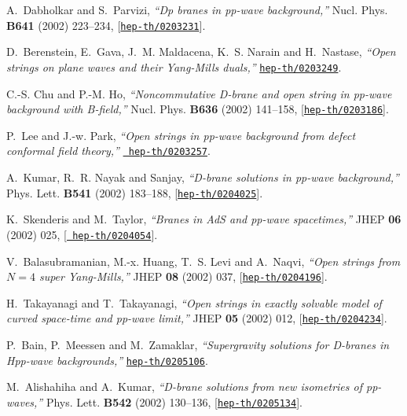 \documentclass[a4paper,12pt]{article}
\numberwithin{equation}{section}
\begin{document}
\begin{thebibliography}{10}
A.~Dabholkar and S.~Parvizi, {\it ``{D}p branes in pp-wave background,''}
  Nucl. Phys. {\bf B641} (2002) 223--234,
  [\href{http://arXiv.org/abs/hep-th/0203231}{{\tt hep-th/0203231}}].

D.~Berenstein, E.~Gava, J.~M. Maldacena, K.~S. Narain and H.~Nastase, {\it
  ``Open strings on plane waves and their {Y}ang-{M}ills duals,''}
  \href{http://arXiv.org/abs/hep-th/0203249}{{\tt hep-th/0203249}}.

C.-S. Chu and P.-M. Ho, {\it ``Noncommutative {D}-brane and open string in
  pp-wave background with {B}-field,''}  Nucl. Phys. {\bf B636} (2002)
  141--158, [\href{http://arXiv.org/abs/hep-th/0203186}{{\tt hep-th/0203186}}].

P.~Lee and J.-w. Park, {\it ``Open strings in pp-wave background from defect
  conformal field theory,''}  \href{http://arXiv.org/abs/hep-th/0203257}{{\tt
  hep-th/0203257}}.

A.~Kumar, R.~R. Nayak and Sanjay, {\it ``{D}-brane solutions in pp-wave
  background,''}  Phys. Lett. {\bf B541} (2002) 183--188,
  [\href{http://arXiv.org/abs/hep-th/0204025}{{\tt hep-th/0204025}}].

K.~Skenderis and M.~Taylor, {\it ``Branes in {AdS} and pp-wave spacetimes,''}
  JHEP {\bf 06} (2002) 025, [\href{http://arXiv.org/abs/hep-th/0204054}{{\tt
  hep-th/0204054}}].

V.~Balasubramanian, M.-x. Huang, T.~S. Levi and A.~Naqvi, {\it ``Open strings
  from {$N = 4$} super {Y}ang-{M}ills,''}  JHEP {\bf 08} (2002) 037,
  [\href{http://arXiv.org/abs/hep-th/0204196}{{\tt hep-th/0204196}}].

H.~Takayanagi and T.~Takayanagi, {\it ``Open strings in exactly solvable model
  of curved space-time and pp-wave limit,''}  JHEP {\bf 05} (2002) 012,
  [\href{http://arXiv.org/abs/hep-th/0204234}{{\tt hep-th/0204234}}].

P.~Bain, P.~Meessen and M.~Zamaklar, {\it ``Supergravity solutions for
  {D}-branes in {H}pp-wave backgrounds,''}
  \href{http://arXiv.org/abs/hep-th/0205106}{{\tt hep-th/0205106}}.

M.~Alishahiha and A.~Kumar, {\it ``{D}-brane solutions from new isometries of
  pp-waves,''}  Phys. Lett. {\bf B542} (2002) 130--136,
  [\href{http://arXiv.org/abs/hep-th/0205134}{{\tt hep-th/0205134}}].


\end{thebibliography}
\end{document}
